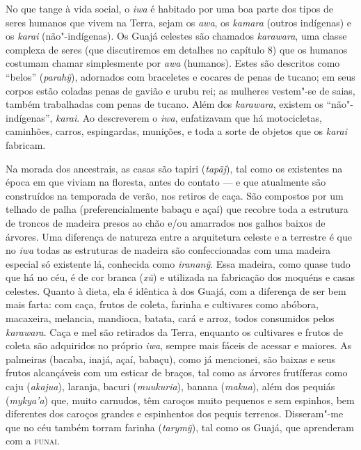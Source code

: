 No que tange à vida social, o \emph{iwa} é habitado por uma boa parte
dos tipos de seres humanos que vivem na Terra, sejam os \emph{awa}, os
\emph{kamara} (outros indígenas) e os \emph{karai} (não"-indígenas). Os
Guajá celestes são chamados \emph{karawara}, uma classe complexa de
seres (que discutiremos em detalhes no capítulo 8) que os humanos
costumam chamar simplesmente por \emph{awa} (humanos). Estes são
descritos como ``belos'' (\emph{parahỹ}), adornados com braceletes e
cocares de penas de tucano; em seus corpos estão coladas penas de gavião
e urubu rei; as mulheres vestem"-se de saias, também trabalhadas com
penas de tucano. Além dos \emph{karawara}, existem os ``não"-indígenas'',
\emph{karai}. Ao descreverem o \emph{iwa}, enfatizavam que há
motocicletas, caminhões, carros, espingardas, munições, e toda a sorte
de objetos que os \emph{karai} fabricam.

Na morada dos ancestrais, as casas são tapiri (\emph{tapãj}), tal como
os existentes na época em que viviam na floresta, antes do contato --- e
que atualmente são construídos na temporada de verão, nos retiros de
caça. São compostos por um telhado de palha (preferencialmente babaçu e
açaí) que recobre toda a estrutura de troncos de madeira presos ao chão
e/ou amarrados nos galhos baixos de árvores. Uma diferença de natureza
entre a arquitetura celeste e a terrestre é que no \emph{iwa} todas as
estruturas de madeira são confeccionadas com uma madeira especial só
existente lá, conhecida como \emph{irananỹ}. Essa madeira, como quase
tudo que há no céu, é de cor branca (\emph{xũ}) e utilizada na
fabricação dos moquéns e casas celestes. Quanto à dieta, ela é idêntica
à dos Guajá, com a diferença de ser bem mais farta: com caça, frutos de
coleta, farinha e cultivares como abóbora, macaxeira, melancia,
mandioca, batata, cará e arroz, todos consumidos pelos \emph{karawara}.
Caça e mel são retirados da Terra, enquanto os cultivares e frutos de
coleta são adquiridos no próprio \emph{iwa}, sempre mais fáceis de
acessar e maiores. As palmeiras (bacaba, inajá, açaí, babaçu), como já
mencionei, são baixas e seus frutos alcançáveis com um esticar de
braços, tal como as árvores frutíferas como caju (\emph{akajua}),
laranja, bacuri (\emph{muukuria}), banana (\emph{makua}), além dos
pequiás (\emph{mykya'a}) que, muito carnudos, têm caroços muito pequenos
e sem espinhos, bem diferentes dos caroços grandes e espinhentos dos
pequis terrenos. Disseram"-me que no céu também torram farinha
(\emph{tarymỹ}), tal como os Guajá, que aprenderam com a \textsc{funai}.

